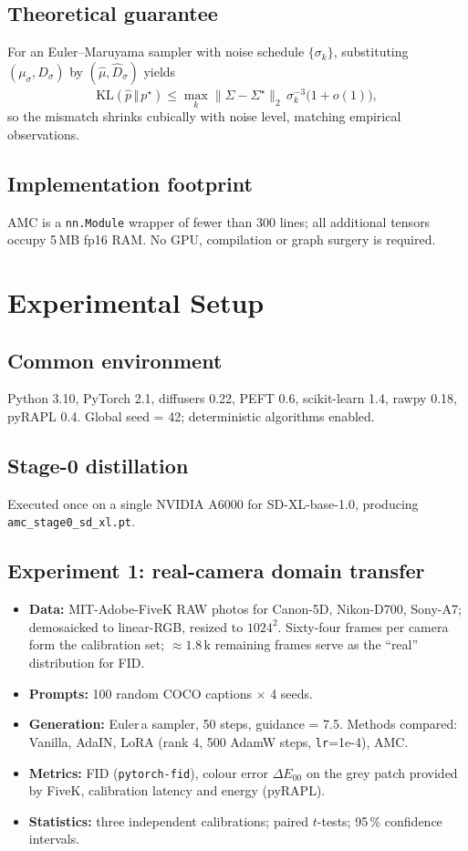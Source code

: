 \documentclass{article} %
\begin{document}
\subsection{Theoretical guarantee}
For an Euler--Maruyama sampler with noise schedule $\{\sigma_{k}\}$, substituting $(\mu_{\sigma},D_{\sigma})$ by $(\hat\mu,\hat D_{\sigma})$ yields
\[
\mathrm{KL}(\hat p\,\Vert\,p^{\star})\le\max_{k}\lVert\hat\Sigma-\Sigma^{\star}\rVert_{2}\,\sigma_{k}^{-3}\bigl(1+o(1)\bigr),
\]
so the mismatch shrinks cubically with noise level, matching empirical observations.

\subsection{Implementation footprint}
AMC is a \texttt{nn.Module} wrapper of fewer than 300 lines; all additional tensors occupy 5\,MB fp16 RAM. No GPU, compilation or graph surgery is required.

\section{Experimental Setup}
\label{sec:experimental}
\subsection{Common environment}
Python 3.10, PyTorch 2.1, diffusers 0.22, PEFT 0.6, scikit-learn 1.4, rawpy 0.18, pyRAPL 0.4. Global seed = 42; deterministic algorithms enabled.

\subsection{Stage-0 distillation}
Executed once on a single NVIDIA A6000 for SD-XL-base-1.0, producing \texttt{amc\_stage0\_sd\_xl.pt}.

\subsection{Experiment 1: real-camera domain transfer}
\begin{itemize}
  \item\textbf{Data:} MIT-Adobe-FiveK RAW photos for Canon-5D, Nikon-D700, Sony-A7; demosaicked to linear-RGB, resized to $1024^{2}$. Sixty-four frames per camera form the calibration set; $\approx1.8\,\text{k}$ remaining frames serve as the ``real'' distribution for FID.
  \item\textbf{Prompts:} 100 random COCO captions $\times$ 4 seeds.
  \item\textbf{Generation:} Euler\,a sampler, 50 steps, guidance = 7.5. Methods compared: Vanilla, AdaIN, LoRA (rank 4, 500 AdamW steps, \texttt{lr}=1e-4), AMC.
  \item\textbf{Metrics:} FID (\texttt{pytorch-fid}), colour error $\Delta E_{00}$ on the grey patch provided by FiveK, calibration latency and energy (pyRAPL).
  \item\textbf{Statistics:} three independent calibrations; paired $t$-tests; 95\,\% confidence intervals.
\end{itemize}
\end{document}
